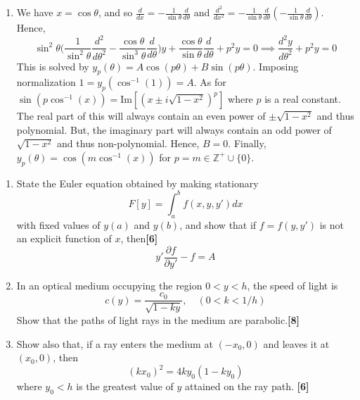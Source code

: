\documentclass[a4paper]{article}
\begin{document}
\begin{ans}
\begin{enumerate}[label=(\alph*)]
\begin{itemize}
\end{itemize}
\item We have $x=\cos\theta$, and so $\frac{d}{dx}=-\frac{1}{\sin\theta}\frac{d}{d\theta}$ and $\frac{d^2}{dx^2}=-\frac{1}{\sin\theta}\frac{d}{d\theta}(-\frac{1}{\sin\theta}\frac{d}{d\theta})$. Hence,
$$\sin^2\theta\bigg(\frac{1}{\sin^2\theta}\frac{d^2}{d\theta^2}-\frac{\cos\theta}{\sin^3\theta}\frac{d}{d\theta}\bigg)y+\frac{\cos\theta}{\sin\theta}\frac{d}{d\theta}+p^2y=0\implies\frac{d^2y}{d\theta^2}+p^2y=0$$
This is solved by $y_p(\theta)=A\cos(p\theta)+B\sin(p\theta)$. Imposing normalization $1=y_p(\cos^{-1}(1))=A$. As for $\sin(p\cos^{-1}(x))=\text{Im}[(x\pm i\sqrt{1-x^2})^p]$ where $p$ is a real constant. The real part of this will always contain an even power of $\pm\sqrt{1-x^2}$ and thus polynomial. But, the imaginary part will always contain an odd power of $\sqrt{1-x^2}$ and thus non-polynomial. Hence, $B=0$. Finally, $y_p(\theta)=\cos(m\cos^{-1}(x))$ for $p=m\in\mathbb{Z}^+\cup\{0\}$.
\end{enumerate}
\end{ans}
\begin{qns}\leavevmode
\begin{enumerate}[label=(\alph*)]
    \item State the Euler equation obtained by making stationary 
$$F[y]=\int_a^bf(x,y,y')dx$$
with fixed values of $y(a)$ and $y(b)$, and show that if $f=f(y,y')$ is not an explicit function of $x$, then\hfill \textbf{[6]} $$y'\frac{\partial f}{\partial y'}-f=A$$
\item In an optical medium occupying the region $0<y<h$, the speed of light is
$$c(y)=\frac{c_0}{\sqrt{1-ky}},\quad (0<k<1/h)$$
Show that the paths of light rays in the medium are parabolic.\hfill \textbf{[8]}
\item Show also that, if a ray enters the medium at $(-x_0,0)$ and leaves it at $(x_0,0)$, then
$$(kx_0)^2=4ky_0(1-ky_0)$$
where $y_0<h$ is the greatest value of $y$ attained on the ray path. \hfill \textbf{[6]}
\end{enumerate}
\end{qns}
\end{document}
